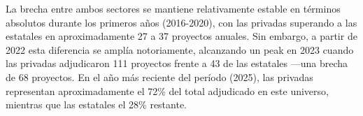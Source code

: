 \documentclass[
  spanish,
  a4paper,
  oneside]{scrbook}
\begin{document}
La brecha entre ambos sectores se mantiene relativamente estable en
términos absolutos durante los primeros años (2016-2020), con las
privadas superando a las estatales en aproximadamente 27 a 37 proyectos
anuales. Sin embargo, a partir de 2022 esta diferencia se amplía
notoriamente, alcanzando un peak en 2023 cuando las privadas adjudicaron
111 proyectos frente a 43 de las estatales ---una brecha de 68
proyectos. En el año más reciente del período (2025), las privadas
representan aproximadamente el 72\% del total adjudicado en este
universo, mientras que las estatales el 28\% restante.

\begin{table}

\caption{\label{tbl-clasificacion-publica-privada}Clasificación de
instituciones según naturaleza jurídica: estatales vs privadas}

\centering{

\centering\begingroup\fontsize{10}{12}\selectfont

}
\end{table}
\end{document}
